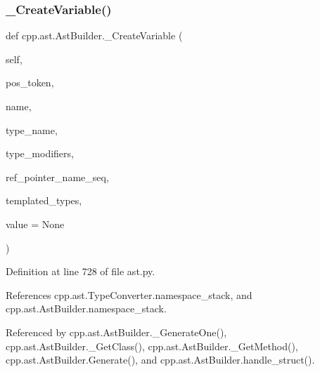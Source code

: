 \subsubsection{\texorpdfstring{\+\_\+\+Create\+Variable()}{\_CreateVariable()}}
{\footnotesize\ttfamily def cpp.\+ast.\+Ast\+Builder.\+\_\+\+Create\+Variable (\begin{DoxyParamCaption}\item[{}]{self,  }\item[{}]{pos\+\_\+token,  }\item[{}]{name,  }\item[{}]{type\+\_\+name,  }\item[{}]{type\+\_\+modifiers,  }\item[{}]{ref\+\_\+pointer\+\_\+name\+\_\+seq,  }\item[{}]{templated\+\_\+types,  }\item[{}]{value = {\ttfamily None} }\end{DoxyParamCaption})\hspace{0.3cm}{\ttfamily [private]}}



Definition at line 728 of file ast.\+py.



References cpp.\+ast.\+Type\+Converter.\+namespace\+\_\+stack, and cpp.\+ast.\+Ast\+Builder.\+namespace\+\_\+stack.



Referenced by cpp.\+ast.\+Ast\+Builder.\+\_\+\+Generate\+One(), cpp.\+ast.\+Ast\+Builder.\+\_\+\+Get\+Class(), cpp.\+ast.\+Ast\+Builder.\+\_\+\+Get\+Method(), cpp.\+ast.\+Ast\+Builder.\+Generate(), and cpp.\+ast.\+Ast\+Builder.\+handle\+\_\+struct().



